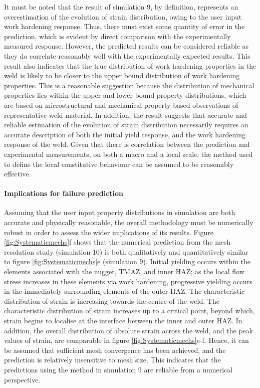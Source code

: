 It must be noted that the result of simulation 9, by definition, represents an overestimation of the evolution of strain distribution, owing to the user input work hardening response. Thus, there must exist some quantity of error in the prediction, which is evident by direct comparison with the experimentally measured response. However, the predicted results can be considered reliable as they do correlate reasonably well with the experimentally expected results. This result also indicates that the true distribution of work hardening properties in the weld is likely to be closer to the upper bound distribution of work hardening properties. This is a reasonable suggestion because the distribution of mechanical properties lies within the upper and lower bound property distributions, which are based on microstructural and mechanical property based observations of representative weld material. In addition, the result suggests that accurate and reliable estimation of the evolution of strain distribution necessarily requires an accurate description of both the initial yield response, and the work hardening response of the weld. Given that there is correlation between the prediction and experimental measurements, on both a macro and a local scale, the method used to define the local constitutive behaviour can be assumed to be reasonably effective. 

\paragraph{Implications for failure prediction}
\label{SMDModellingstudyDiscussionPropertydistributionsImplications}
Assuming that the user input property distributions in simulation are both accurate and physically reasonable, the overall methodology must be numerically robust in order to assess the wider implications of its results. Figure \ref{fig:Systematicmechs}f shows that the numerical prediction from the mesh resolution study (simulation 10) is both qualitatively and quantitatively similar to figure \ref{fig:Systematicmechs}e (simulation 9). Initial yielding occurs within the elements associated with the nugget, TMAZ, and inner HAZ; as the local flow stress increases in these elements via work hardening, progressive yielding occurs in the immediately surrounding elements of the outer HAZ. The characteristic distribution of strain is increasing towards the centre of the weld. The characteristic distribution of strain increases up to a critical point, beyond which, strain begins to localise at the interface between the inner and outer HAZ. In addition, the overall distribution of absolute strain across the weld, and the peak values of strain, are comparable in figure \ref{fig:Systematicmechs}e-f. Hence, it can be assumed that sufficient mesh convergence has been achieved, and the prediction is relatively insensitive to mesh size. This indicates that the predictions using the method in simulation 9 are reliable from a numerical perspective.

